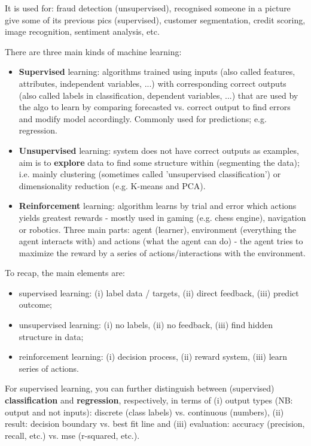 \documentclass[11pt]{article}
\begin{document}
It is used for: fraud detection (unsupervised), recognised someone in a picture give some of its previous pics (supervised), customer segmentation, credit scoring, image recognition, sentiment analysis, etc.

There are three main kinds of machine learning:
\begin{itemize}
	\item \textbf{Supervised} learning: algorithms trained using inputs (also called features, attributes, independent variables, ...) with corresponding correct outputs (also called labels in classification, dependent variables, ...) that are used by the algo to learn by comparing forecasted vs. correct output to find errors and modify model accordingly. Commonly used for predictions; e.g. regression.
	\item \textbf{Unsupervised} learning: system does not have correct outputs as examples, aim is to \textbf{explore} data to find some structure within (segmenting the data); i.e. mainly clustering (sometimes called 'unsupervised classification') or dimensionality reduction (e.g. K-means and PCA).
	\item \textbf{Reinforcement} learning: algorithm learns by trial and error which actions yields greatest rewards - mostly used in gaming (e.g. chess engine), navigation or robotics. Three main parts: agent (learner), environment (everything the agent interacts with) and actions (what the	agent can do) - the agent tries to maximize the reward by a series of actions/interactions with the environment.
\end{itemize}

To recap, the main elements are:
\begin{itemize}
	\item supervised learning: (i) label data / targets, (ii) direct feedback, (iii) predict outcome;
	\item unsupervised learning: (i) no labels, (ii) no feedback, (iii) find hidden structure in data;
	\item reinforcement learning: (i) decision process, (ii) reward system, (iii) learn series of actions.
\end{itemize}

For supervised learning, you can further distinguish between (supervised) \textbf{classification} and \textbf{regression}, respectively, in terms of (i) output types (NB: output and not inputs): discrete (class labels) vs. continuous (numbers), (ii) result: decision boundary vs. best fit line and (iii) evaluation: accuracy (precision, recall, etc.) vs. mse (r-squared, etc.).
\end{document}
